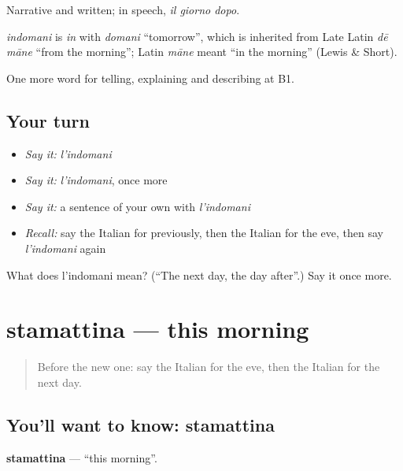 Narrative and written; in speech, \emph{il giorno dopo}.

\begin{cousinweb}
\emph{indomani} is \emph{in} with \emph{domani} \textquotedblleft{}tomorrow\textquotedblright{}, which is inherited from Late Latin \emph{dē māne} \textquotedblleft{}from the morning\textquotedblright{}; Latin \emph{māne} meant \textquotedblleft{}in the morning\textquotedblright{} (Lewis \& Short).
\end{cousinweb}

\begin{grammarlens}[title={What you've built}]
One more word for telling, explaining and describing at B1.
\end{grammarlens}

\subsection*{Your turn}
\begin{itemize}
\raggedright
  \item \emph{Say it:} \emph{l'indomani}
  \item \emph{Say it:} \emph{l'indomani}, once more
  \item \emph{Say it:} a sentence of your own with \emph{l'indomani}
  \item \emph{Recall:} say the Italian for previously, then the Italian for the eve, then say \emph{l'indomani} again
\end{itemize}

\begin{tcolorbox}[breakable,colback=teal!4,colframe=teal!35!black,title={Before you move on}]
What does l'indomani mean? (\textquotedblleft{}The next day, the day after\textquotedblright{}.) Say it once more.
\end{tcolorbox}
\section[stamattina]{stamattina — this morning}

\label{lesson:IT-C281-stamattina}



\begin{quote}
Before the new one: say the Italian for the eve, then the Italian for the next day.
\end{quote}

\subsection*{You'll want to know: stamattina}
\textbf{stamattina} — \textquotedblleft{}this morning\textquotedblright{}.

